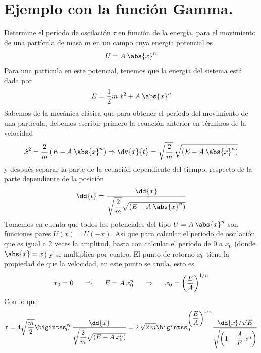 \section{Ejemplo con la función Gamma.}
Determine el período de oscilación $\tau$ en función de la energía, para el movimiento de una partícula de masa $m$ en un campo cuya energía potencial es
\begin{align*}
U = A \: \abs{x}^{n}
\end{align*}
Para una partícula en este potencial, tenemos que la energía del sistema está dada por
\begin{align*}
E = \dfrac{1}{2} m \: \dot{x}^{2} + A \: \abs{x}^{n}
\end{align*}
Sabemos de la mecánica clásica que para obtener el período del movimiento de una partícula, debemos escribir primero la ecuación anterior en términos de la velocidad
\begin{align*}
\dot{x}^{2} = \dfrac{2}{m} \left( E - A \: \abs{x}^{n} \right) \Rightarrow \dv{x}{t} =  \sqrt{\dfrac{2}{m}} \: \sqrt{\left( E - A \: \abs{x}^{n} \right)}
\end{align*}
y después separar la parte de la ecuación dependiente del tiempo, respecto de la parte dependiente de la posición
\begin{align*}
\dd{t} = \dfrac{\dd{x}}{\sqrt{\dfrac{2}{m}} \sqrt{\left( E - A \: \abs{x}^{n} \right)}}
\end{align*}
Tomemos en cuenta que todos los potenciales del tipo $U = A \: \abs{x}^{n}$ son funciones pares $U(x) =  U(-x)$. Así que para calcular el período de oscilación, que es igual a 2 veces la amplitud, basta con calcular el período de $0$ a $x_{0}$ (donde $\abs{x} = x$) y se multiplica por cuatro. El punto de retorno $x_{0}$ tiene la propiedad de que la velocidad, en este punto se anula, esto es
\begin{align*}
\dot{x_{0}} = 0 \hspace{0.5cm} \Rightarrow \hspace{0.5cm} E = A \: x_{0}^{n} \hspace{0.5cm} \Rightarrow \hspace{0.5cm} x_{0} = \left( \dfrac{E}{A} \right)^{1/n}
\end{align*}
Con lo que
\begin{align*}
\tau =  4 \sqrt{\dfrac{m}{2}} \bigintss_{0}^{x_{0}} \dfrac{\dd{x}}{\sqrt{\dfrac{2}{m}} \sqrt{\left( E - A \: x_{0}^{n} \right)}} = 2 \: \sqrt{2 \, m} \bigintss_{0}^{\left( \dfrac{E}{A} \right)^{1/n}} \dfrac{\dd{x} / \sqrt{E}}{\sqrt{ \left( 1 - \dfrac{A}{E} \: x^{n} \right) }}
\end{align*}
